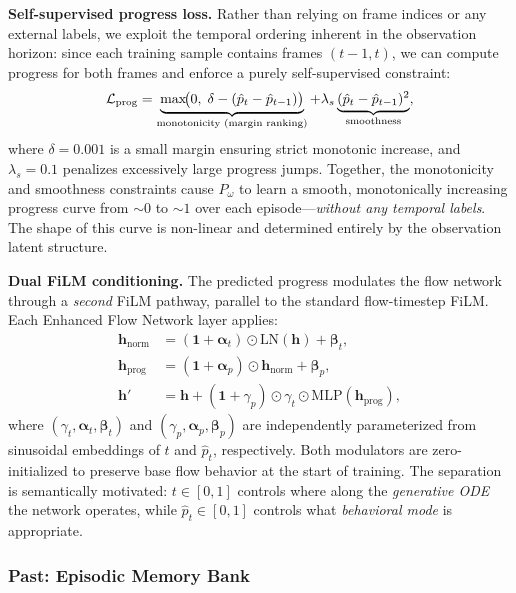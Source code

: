 \textbf{Self-supervised progress loss.} Rather than relying on frame indices or any external labels, we exploit the temporal ordering inherent in the observation horizon: since each training sample contains frames $(t{-}1, t)$, we can compute progress for both frames and enforce a purely self-supervised constraint:
\begin{equation}
    \mathcal{L}_{\text{prog}} = \underbrace{\max\!\bigl(0,\; \delta - (\hat{p}_t - \hat{p}_{t-1})\bigr)}_{\text{monotonicity (margin ranking)}} + \lambda_s \underbrace{(\hat{p}_t - \hat{p}_{t-1})^2}_{\text{smoothness}},
    \label{eq:progress_loss}
\end{equation}
where $\delta = 0.001$ is a small margin ensuring strict monotonic increase, and $\lambda_s = 0.1$ penalizes excessively large progress jumps. Together, the monotonicity and smoothness constraints cause $P_\omega$ to learn a smooth, monotonically increasing progress curve from $\sim\!0$ to $\sim\!1$ over each episode---\emph{without any temporal labels}. The shape of this curve is non-linear and determined entirely by the observation latent structure.

\textbf{Dual FiLM conditioning.} The predicted progress modulates the flow network through a \emph{second} FiLM pathway, parallel to the standard flow-timestep FiLM. Each Enhanced Flow Network layer applies:
\begin{align}
    \bm{h}_{\text{norm}} &= (\bm{1} + \bm{\alpha}_t) \odot \text{LN}(\bm{h}) + \bm{\beta}_t, \label{eq:dual_film_time} \\
    \bm{h}_{\text{prog}} &= (\bm{1} + \bm{\alpha}_p) \odot \bm{h}_{\text{norm}} + \bm{\beta}_p, \label{eq:dual_film_prog} \\
    \bm{h}' &= \bm{h} + (\bm{1} + \gamma_p) \odot \gamma_t \odot \text{MLP}(\bm{h}_{\text{prog}}), \label{eq:dual_film_out}
\end{align}
where $(\gamma_t, \bm{\alpha}_t, \bm{\beta}_t)$ and $(\gamma_p, \bm{\alpha}_p, \bm{\beta}_p)$ are independently parameterized from sinusoidal embeddings of $t$ and $\hat{p}_t$, respectively. Both modulators are zero-initialized to preserve base flow behavior at the start of training. The separation is semantically motivated: $t \in [0,1]$ controls where along the \emph{generative ODE} the network operates, while $\hat{p}_t \in [0,1]$ controls what \emph{behavioral mode} is appropriate.

\subsubsection{Past: Episodic Memory Bank}
\label{sec:memory}

